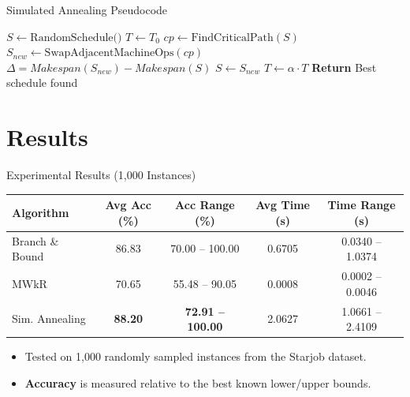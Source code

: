 \documentclass{beamer}
\begin{document}
\begin{frame}{Simulated Annealing Pseudocode}
    \scriptsize
    \begin{algorithmic}[1]
        \State $S \leftarrow \text{RandomSchedule()}$ 
        \State $T \leftarrow T_0$
            \State $cp \leftarrow \text{FindCriticalPath}(S)$
            \State $S_{new} \leftarrow \text{SwapAdjacentMachineOps}(cp)$
            \State $\Delta = Makespan(S_{new}) - Makespan(S)$
                \State $S \leftarrow S_{new}$
            \EndIf
            \State $T \leftarrow \alpha \cdot T$
        \EndWhile
        \State \textbf{Return} Best schedule found
    \end{algorithmic}
\end{frame}

\section{Results}

\begin{frame}{Experimental Results (1,000 Instances)}
    \vspace{1em}
    \centering
    
    { %
    \scriptsize 
    \setlength{\tabcolsep}{4pt}
    \begin{tabular}{l c c c c}
        \toprule
        \textbf{Algorithm} & \textbf{Avg Acc (\%)} & \textbf{Acc Range (\%)} & \textbf{Avg Time (s)} & \textbf{Time Range (s)} \\
        \midrule
        Branch \& Bound & 86.83 & 70.00 -- 100.00 & 0.6705 & 0.0340 -- 1.0374 \\
        MWkR            & 70.65 & 55.48 -- 90.05  & 0.0008 & 0.0002 -- 0.0046 \\
        \rowcolor{green!10} Sim. Annealing  & \textbf{88.20} & \textbf{72.91 -- 100.00} & 2.0627 & 1.0661 -- 2.4109 \\
        \bottomrule
    \end{tabular}
    }
    
    \vspace{2em}
    \small
    \begin{itemize}
        \item Tested on 1,000 randomly sampled instances from the Starjob dataset.
        \item \textbf{Accuracy} is measured relative to the best known lower/upper bounds.
    \end{itemize}
\end{frame}
\end{document}
